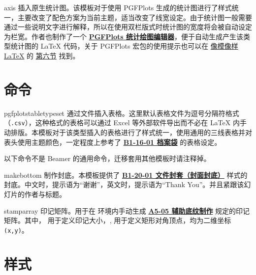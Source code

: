 \documentclass[a4paper,12pt]{article}
\begin{document}
\begin{CJK}{UTF8}{song}
\begin{docEnvironment*}[doclang/environment content=code]{axis}{}
    插入原生统计图。该模板对于使用 \textsf{PGFPlots} 生成的统计图进行了样式统一，主要改变了配色方案为当前主题，适当改变了线宽设定。由于统计图一般需要通过一些说明文字进行解释，所以在使用双栏版式时统计图的宽度将会被自动设定为栏宽。作者也制作了一个 \href{https://logcreative.github.io/PGFPlotsEdt/index.html?lang=cn}{\textbf{PGFPlots 统计绘图编辑器}}，便于自动生成产生该类型统计图的 \LaTeX{} 代码，关于 \textsf{PGFPlots} 宏包的使用提示也可以在 \href{https://logcreative.github.io/LaTeXSparkle/}{像模像样\LaTeX} 的 \href{https://logcreative.github.io/LaTeXSparkle/src/art/chapter06.html}{第六节} 找到。
\end{docEnvironment*}

\section{命令}

\begin{docCommand*}[]{pgfplotstabletypeset}{}
    通过文件插入表格。这里默认表格文件为逗号分隔符格式（\verb".csv"），这种格式的表格可以通过 Excel 等外部软件导出而不必在 \LaTeX{} 内手动排版。本模板对于该类型插入的表格进行了样式统一，使用通用的三线表格并对表头使用主题颜色，一定程度上参考了 \href{https://vi.sjtu.edu.cn/index.php/articles/app/7}{\textbf{B1-16-01 档案袋}} 的表格设定。
\end{docCommand*}

以下命令不是 \textsf{Beamer} 的通用命令，迁移套用其他模板时请注释掉。

\begin{docCommand*}[]{makebottom}{}
    制作封底。本模板提供了 \href{https://vi.sjtu.edu.cn/index.php/articles/app/7}{\textbf{B1-20-01 文件封套（封面封底）}} 样式的封底。中文时，提示语为“谢谢”，英文时，提示语为``Thank You''。并且紧跟该幻灯片的作者与标题。
\end{docCommand*}

\begin{docCommand*}[]{stamparray}{}
    印记矩阵。用于在  环境内手动生成 \href{http://vi.sjtu.edu.cn/index.php/articles/base/5}{\textbf{A5-05 辅助底纹制作}} 规定的印记矩阵。其中， 用于定义印记大小，, 用于定义矩形对角顶点，均为二维坐标 \verb"(x,y)"。 
\end{docCommand*}

\newpage
\section{样式}


\end{CJK}
\end{document}
